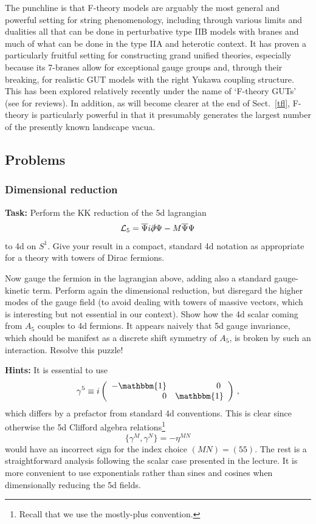 \documentclass[12pt]{article}
\newcommand{\be}{\begin{equation}}
\newcommand{\ee}{\end{equation}}
\newcommand{\ol}{\overline}
\numberwithin{equation}{section}
\begin{document}
The punchline is that F-theory models are arguably the most general and powerful setting for string phenomenology, including through various limits and dualities all that can be done in perturbative type IIB models with branes and much of what can be done in the type IIA and heterotic context. It has proven a particularly fruitful setting for constructing grand unified theories, especially because its 7-branes allow for exceptional gauge groups and, through their breaking, for realistic GUT models with the right Yukawa coupling structure. This has been explored relatively recently under the name of `F-theory GUTs' \cite{Beasley:2008dc, Donagi:2008ca} (see \cite{Weigand:2010wm, Heckman:2010bq} for reviews). In addition, as will become clearer at the end of Sect.~\ref{tfl}, F-theory is particularly powerful in that it presumably generates the largest number of the presently known landscape vacua.





\subsection{Problems}

\subsubsection{Dimensional reduction}

{\bf Task:} Perform the KK reduction of the 5d lagrangian
\be
{\cal L}_5=\ol{\Psi}i\slashed{\partial}\Psi-M\ol{\Psi}\Psi
\ee
to 4d on $S^1$. Give your result in a compact, standard 4d notation as appropriate for a theory with towers of Dirac fermions.

Now gauge the fermion in the lagrangian above, adding also a standard gauge-kinetic term. Perform again the dimensional reduction, but disregard the higher modes of the gauge field (to avoid dealing with towers of massive vectors, which is interesting but not essential in our context). Show how the 4d scalar coming from $A_5$ couples to 4d fermions. It appears naively that 5d gauge invariance, which should be manifest as a discrete shift symmetry of $A_5$, is broken by such an interaction. Resolve this puzzle!

\noindent
{\bf Hints:} It is essential to use
\be
\gamma^5\equiv i\left(\begin{array}{rr}
-\mathbbm{1} & 0\
\\
0 & \mathbbm{1}
\end{array}\right)\,,
\ee
which differs by a prefactor from standard 4d conventions. This is clear since otherwise the 5d Clifford algebra relations\footnote{
Recall that we 
use the mostly-plus convention.
}
\be
\{\gamma^M,\gamma^N\}=-\eta^{MN}
\ee
would have an incorrect sign for the index choice $(MN)=(55)$. The rest is a straightforward analysis following the scalar case presented in the lecture. 
It is more convenient to use exponentials rather than sines and cosines when dimensionally reducing the 5d fields.
\end{document}
